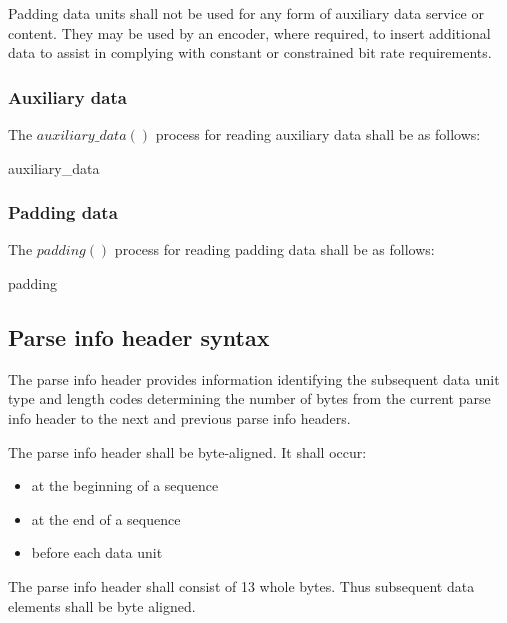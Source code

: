 Padding data units shall not be used for any form of auxiliary data 
service or content. They may be used by an encoder, where required, 
to insert additional data to assist in complying with constant or constrained bit rate requirements.

\subsubsection{Auxiliary data}\label{auxdata}

The $auxiliary\_data()$ process for reading auxiliary data shall be as follows:

\begin{pseudo}{auxiliary\_data}{}
\bsEND
\end{pseudo}

\subsubsection{Padding data}\label{paddingdata}

The $padding()$ process for reading padding data shall be as follows:

\begin{pseudo}{padding}{}
\bsEND
\end{pseudo}

\subsection{Parse info header syntax}
\label{parseinfoheader}

The parse info header provides information identifying the subsequent data unit
type and length codes determining the number of bytes from the current parse
info header to the next and previous parse info headers.

The parse info header shall be byte-aligned. It shall occur:
\begin{itemize}
\item at the beginning of a sequence
\item at the end of a sequence
\item before each data unit
\end{itemize}

The parse info header shall consist of 13 whole bytes. Thus subsequent data elements
shall be byte aligned.

